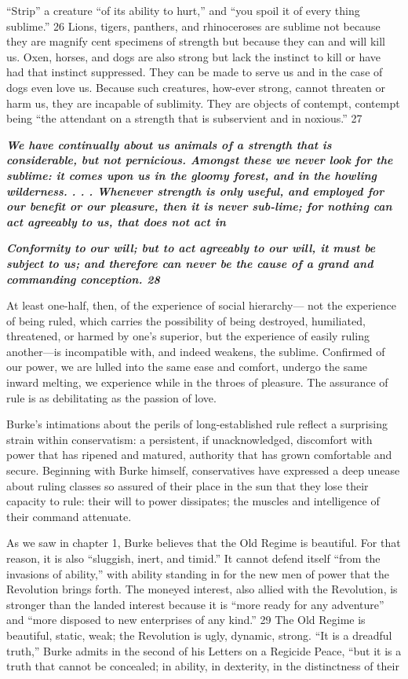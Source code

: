 “Strip” a creature “of its ability to hurt,” and “you spoil it of every thing sublime.” {\color{blue} 26 } Lions, tigers, panthers, and rhinoceroses are sublime not because they are magnify cent specimens of strength but because they can and will kill us. Oxen, horses, and dogs are also strong but lack the instinct to kill or have had that instinct suppressed. They can be made to serve us and in the case of dogs even love us. Because such creatures, how-ever strong, cannot threaten or harm us, they are incapable of sublimity. They are objects of contempt, contempt being “the attendant on a strength that is subservient and in noxious.” 27{\par} {\textbf{\textit{We have continually about us animals of a strength that is considerable, but not pernicious. Amongst these we never look for the sublime: it comes upon us in the gloomy forest, and in the howling wilderness. . . . Whenever strength is only useful, and employed for our benefit or our pleasure, then it is never sub-lime; for nothing can act agreeably to us, that does not act in} } }{\par} {\par} {\textbf{\textit{Conformity to our will; but to act agreeably to our will, it must be subject to us; and therefore can never be the cause of a grand and commanding conception. {\color{blue} 28 } } } }{\par} At least one-half, then, of the experience of social hierarchy— not the experience of being ruled, which carries the possibility of being destroyed, humiliated, threatened, or harmed by one’s superior, but the experience of easily ruling another—is incompatible with, and indeed weakens, the sublime. Confirmed of our power, we are lulled into the same ease and comfort, undergo the same inward melting, we experience while in the throes of pleasure. The assurance of rule is as debilitating as the passion of love.{\par} Burke’s intimations about the perils of long-established rule reflect a surprising strain within conservatism: a persistent, if unacknowledged, discomfort with power that has ripened and matured, authority that has grown comfortable and secure. Beginning with Burke himself, conservatives have expressed a deep unease about ruling classes so assured of their place in the sun that they lose their capacity to rule: their will to power dissipates; the muscles and intelligence of their command attenuate.{\par} As we saw in chapter 1, Burke believes that the Old Regime is beautiful. For that reason, it is also “sluggish, inert, and timid.” It cannot defend itself “from the invasions of ability,” with ability standing in for the new men of power that the Revolution brings forth. The moneyed interest, also allied with the Revolution, is stronger than the landed interest because it is “more ready for any adventure” and “more disposed to new enterprises of any kind.” {\color{blue} 29 } The Old Regime is beautiful, static, weak; the Revolution is ugly, dynamic, strong. “It is a dreadful truth,” Burke admits in the second of his Letters on a Regicide Peace, “but it is a truth that cannot be concealed; in ability, in dexterity, in the distinctness of their 